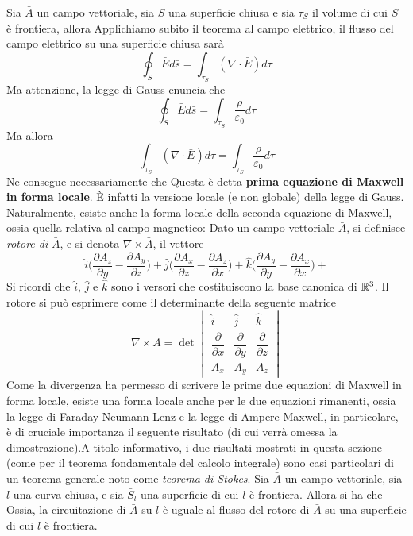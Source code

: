 \documentclass[10pt, letterpaper]{report}
\begin{document}
 Sia $\bar A$ un campo vettoriale, sia $S$ una superficie chiusa e sia $\tau_S$ il volume di cui $S$ è frontiera, allora
Applichiamo subito il teorema al campo elettrico, il flusso del campo elettrico su una superficie chiusa sarà 
$$\oint_S \bar E d\bar s =\int_{\tau_S}(\nabla \cdot \bar E)d\tau $$
Ma attenzione, la legge di Gauss enuncia che 
$$\oint_S \bar E d\bar s =\int_{\tau_S}\frac{\rho}{\varepsilon_0}d\tau $$
Ma allora 
$$\int_{\tau_S}(\nabla \cdot \bar E)d\tau=\int_{\tau_S}\frac{\rho}{\varepsilon_0}d\tau $$
Ne consegue \underline{necessariamente} che 
Questa è detta \textbf{prima equazione di Maxwell in forma locale}. È infatti la versione locale (e non globale) della legge di Gauss. Naturalmente, esiste anche la forma locale della seconda equazione di Maxwell, ossia quella relativa al campo magnetico:
 Dato un campo vettoriale $\bar A$, si definisce \textit{rotore di } $\bar A$, e si denota $\nabla \times \bar A $, il vettore 
$$\hat i\Big(\frac{\partial A_z}{\partial y}-\frac{\partial A_y}{\partial z}\Big)+
\hat j\Big(\frac{\partial A_x}{\partial z}-\frac{\partial A_z}{\partial x}\Big)+
\hat k\Big(\frac{\partial A_y}{\partial y}-\frac{\partial A_x}{\partial x}\Big)+ $$
Si ricordi che $\hat i$, $\hat j$ e $\hat k$ sono i versori che costituiscono la base canonica di ${\mathbb R}^3$. Il rotore si può esprimere come il determinante della seguente matrice 
$$\nabla \times \bar A=\det\begin{vmatrix}
    \hat i & \hat j & \hat k \\ 
    \dfrac{\partial}{\partial x} &  \dfrac{\partial}{\partial y} &  \dfrac{\partial}{\partial z} \\ 
    A_x & A_y & A_z
\end{vmatrix} $$
Come la divergenza ha permesso di scrivere le prime due equazioni di Maxwell in forma locale, esiste una forma locale anche per le due equazioni rimanenti, ossia la legge di Faraday-Neumann-Lenz e la legge di Ampere-Maxwell, in particolare, è di cruciale importanza il seguente risultato (di cui verrà omessa la dimostrazione).\acc  A titolo informativo, i due risultati mostrati in questa sezione (come per il teorema fondamentale del calcolo integrale) sono casi particolari di un teorema generale noto come \textit{teorema di Stokes}.\acc
{} Sia $\bar A$ un campo vettoriale, sia $l$ una curva chiusa, e sia $\bar S_l$ una superficie di cui $l$ è frontiera. Allora si ha che 
Ossia, la circuitazione di $\bar A$ su $l$ è uguale al flusso del rotore di $\bar A$ su una superficie di cui $l$ è frontiera. 
\end{document}

